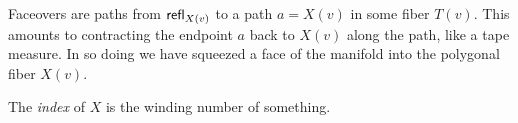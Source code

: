 Faceovers are paths from \( \mathsf{refl}_{X(v)} \) to a path \( a=X(v) \) in some fiber \( T(v) \). This amounts to contracting the endpoint \( a \) back to \( X(v) \) along the path, like a tape measure. In so doing we have squeezed a face of the manifold into the polygonal fiber \( X(v) \).

\begin{mydef}
The \emph{index} of \( X \) is the winding number of something.
\end{mydef}




